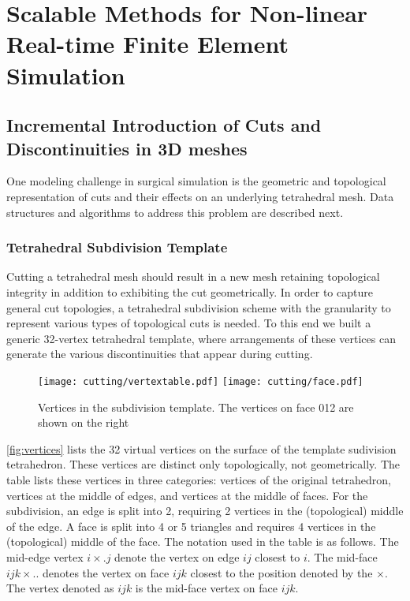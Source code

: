 
% 
\clearpage

\section{Scalable Methods for Non-linear Real-time Finite Element Simulation}\label{sec:fem_simulation}

\subsection{Incremental Introduction of Cuts and Discontinuities in 3D meshes}\label{ssec:discontinuous_fem}
One modeling challenge in surgical simulation is the geometric and topological representation of cuts and their effects on an underlying tetrahedral mesh. Data structures and algorithms to address this problem are described next.

\subsubsection{Tetrahedral Subdivision Template}

Cutting a tetrahedral mesh should result in a new mesh retaining topological integrity in addition to exhibiting the cut geometrically. In order to capture general cut topologies, a tetrahedral subdivision scheme with the granularity to represent various types of topological cuts is needed. To this end we built a generic 32-vertex tetrahedral template, where arrangements of these vertices can generate the various discontinuities that appear during cutting.

\begin{figure}
	\texttt{[image: cutting/vertextable.pdf]}
	\texttt{[image: cutting/face.pdf]}
	\caption{Vertices in the subdivision template. The vertices on face 012 are shown on the right}
	\label{fig:vertices}
\end{figure}

\autoref{fig:vertices} lists the 32 virtual vertices on the surface of the template sudivision tetrahedron. These vertices are distinct only topologically, not geometrically. The table lists these vertices in three categories: vertices of the original tetrahedron, vertices at the middle of edges, and vertices at the middle of faces. For the subdivision, an edge is split into 2, requiring 2 vertices in the (topological) middle of the edge. A face is split into 4 or 5 triangles and requires 4 vertices in the (topological) middle of the face. The notation used in the table is as follows. The mid-edge vertex $i\times .j$ denote the vertex on edge $ij$ closest to $i$. The mid-face $ijk\times ..$ denotes the vertex on face $ijk$ closest to the position denoted by the $\times$. The vertex denoted as $ijk$ is the mid-face vertex on face $ijk$.

